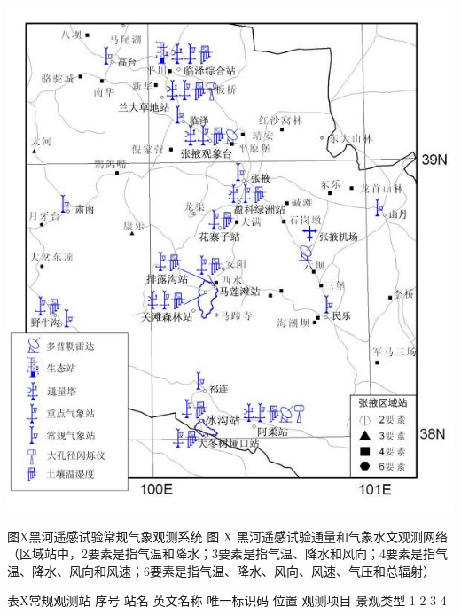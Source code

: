 \documentclass[letterpaper,10pt,english]{sphinxmanual}
\begin{document}
{\hfill\includegraphics{metrology_system.png}\hfill}

图X黑河遥感试验常规气象观测系统
图 X  黑河遥感试验通量和气象水文观测网络
（区域站中，2要素是指气温和降水；3要素是指气温、降水和风向；4要素是指气温、降水、风向和风速；6要素是指气温、降水、风向、风速、气压和总辐射）

表X常规观测站
序号      站名      英文名称    唯一标识码   位置      观测项目    景观类型
1
2
3
4
\end{document}
